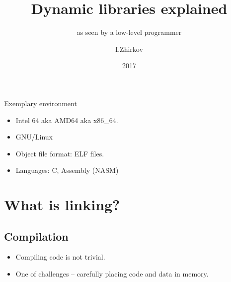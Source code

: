 \documentclass[xcolor={usenames,dvipsnames}]{beamer}
\title{Dynamic libraries explained }
\subtitle{as seen by a low-level programmer}
\author{I.Zhirkov}
\date{2017}
\begin{document}
\begin{frame}
  \titlepage
\end{frame}


\begin{frame}{Exemplary environment}
    \begin{itemize} 
        \item  Intel 64 aka AMD64 aka x86\_64.
        \item  GNU/Linux
        \item  Object file format: ELF files.
        \item Languages: C, Assembly (NASM)
\end{itemize} 
\end{frame}


\section{What is linking?}
\subsection{Compilation}

\begin{frame}{\subsecname}
    \begin{itemize}
 \item  Compiling code is not trivial.
 \item  One of challenges -- carefully placing code and data in memory.
\end{itemize} 
\end{frame}
\end{document}
